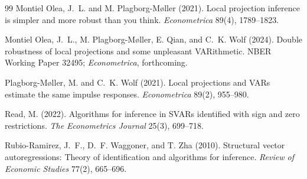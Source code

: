 \documentclass[11pt]{article}
\theoremstyle{definition}
\theoremstyle{plain}
\theoremstyle{remark}
\begin{document}
\begin{thebibliography}{99}
Montiel Olea, J.~L. and M. Plagborg-M{\o}ller (2021).
Local projection inference is simpler and more robust than you think.
\emph{Econometrica} 89(4), 1789--1823.

Montiel Olea, J.~L., M. Plagborg-M{\o}ller, E. Qian, and C.~K. Wolf (2024).
Double robustness of local projections and some unpleasant VARithmetic.
NBER Working Paper 32495; \emph{Econometrica}, forthcoming.

Plagborg-M{\o}ller, M. and C.~K. Wolf (2021).
Local projections and VARs estimate the same impulse responses.
\emph{Econometrica} 89(2), 955--980.

Read, M. (2022).
Algorithms for inference in SVARs identified with sign and zero restrictions.
\emph{The Econometrics Journal} 25(3), 699--718.

Rubio-Ramirez, J.~F., D.~F. Waggoner, and T. Zha (2010).
Structural vector autoregressions: Theory of identification and algorithms for
inference.
\emph{Review of Economic Studies} 77(2), 665--696.

\end{thebibliography}
\end{document}
